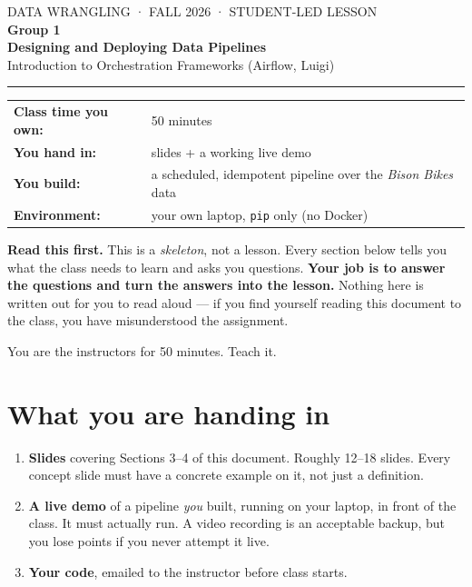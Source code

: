 \documentclass[11pt]{article}
\newcommand{\key}[1]{\textcolor{accent}{\textbf{#1}}}
\begin{document}
\begin{center}
{\color{grayish}\small DATA WRANGLING · FALL 2026 · STUDENT-LED LESSON}\\[6pt]
{\Huge\bfseries\color{brand} Group 1}\\[6pt]
{\LARGE\bfseries\color{ink} Designing and Deploying Data Pipelines}\\[4pt]
{\large\color{ink} Introduction to Orchestration Frameworks (Airflow, Luigi)}\\[10pt]
\rule{\textwidth}{1pt}
\end{center}

\vspace{-4pt}
\begin{center}
\begin{tabular}{@{}ll@{}}
\textbf{Class time you own:} & 50 minutes \\
\textbf{You hand in:} & slides + a working live demo \\
\textbf{You build:} & a scheduled, idempotent pipeline over the \textit{Bison Bikes} data \\
\textbf{Environment:} & your own laptop, \texttt{pip} only (no Docker) \\
\end{tabular}
\end{center}
\vspace{6pt}

\begin{dobox}
\textbf{Read this first.} This is a \emph{skeleton}, not a lesson. Every
section below tells you what the class needs to learn and asks you questions.
\key{Your job is to answer the questions and turn the answers into the lesson.}
Nothing here is written out for you to read aloud --- if you find yourself
reading this document to the class, you have misunderstood the assignment.

You are the instructors for 50 minutes. Teach it.
\end{dobox}

\section{What you are handing in}

\begin{enumerate}
  \item \textbf{Slides} covering Sections 3--4 of this document. Roughly
        12--18 slides. Every concept slide must have a concrete example on it,
        not just a definition.
  \item \textbf{A live demo} of a pipeline \emph{you} built, running on your
        laptop, in front of the class. It must actually run. A video recording
        is an acceptable backup, but you lose points if you never attempt it live.
  \item \textbf{Your code}, emailed to the instructor before class starts.
\end{enumerate}
\end{document}

